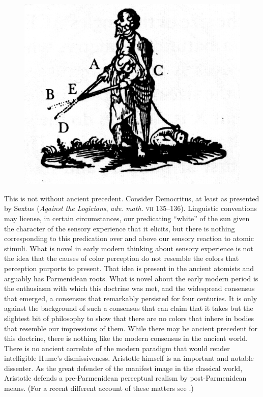 \begin{figure}[htbp]
	\centering
		\includegraphics[scale=2]{graphics/blind.jpeg}
	\caption{\citealt{Descartes:1637uq}}
	\label{fig:blind}
\end{figure}

This is not without ancient precedent. Consider Democritus, at least as presented by Sextus \citeauthor{Empiricus:1997kx} (\emph{Against the Logicians}, \emph{adv. math.} \textsc{vii} 135--136). Linguistic conventions may license, in certain circumstances, our predicating ``white'' of the sun given the character of the sensory experience that it elicits, but there is nothing corresponding to this predication over and above our sensory reaction to atomic stimuli. What is novel in early modern thinking about sensory experience is not the idea that the causes of color perception do not resemble the colors that perception purports to present. That idea is present in the ancient atomists and arguably has Parmenidean roots. What is novel about the early modern period is the enthusiasm with which this doctrine was met, and the widespread consensus that emerged, a consensus that remarkably persisted for four centuries. It is only against the background of such a consensus that \citet[]{Hume:1748zr} can claim that it takes but the slightest bit of philosophy to show that there are no colors that inhere in bodies that resemble our impressions of them. While there may be ancient precedent for this doctrine, there is nothing like the modern consensus in the ancient world. There is no ancient correlate of the modern paradigm that would render intelligible Hume's dismissiveness. Aristotle himself is an important and notable dissenter. As the great defender of the manifest image in the classical world, Aristotle defends a pre-Parmenidean perceptual realism by post-Parmenidean means. (For a recent different account of these matters see \citealt{Lee:2011ys}.)

